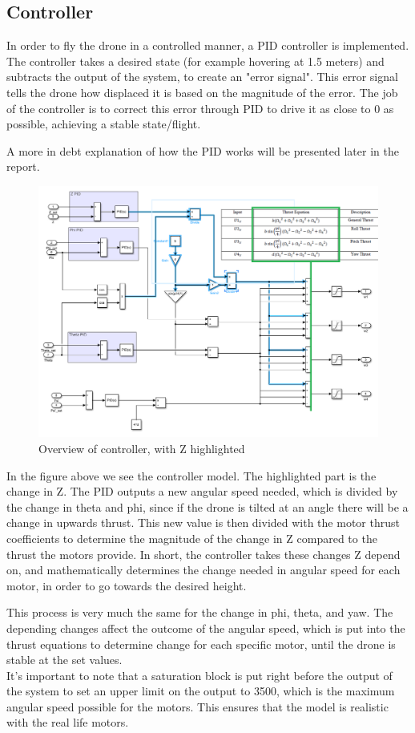 \subsection{Controller}\label{linear}
In order to fly the drone in a controlled manner, a PID controller is implemented.
The controller takes a desired state (for example hovering at 1.5 meters) and subtracts the output of the system, to create an "error signal".
This error signal tells the drone how displaced it is based on the magnitude of the error. The job of the controller is to correct this error through PID to drive it as close to 0 as possible, achieving a stable state/flight.

A more in debt explanation of how the PID works will be presented later in the report. 

\begin{figure}[H]
\begin{center}
   \includegraphics[scale =0.6]{pictures/control/Controller.png}
\end{center}
\caption{Overview of controller, with Z highlighted}
\end{figure}

In the figure above we see the controller model. The highlighted part is the change in Z. The PID outputs a new angular speed needed, which is divided by the change in theta and phi, since if the drone is tilted at an angle there will be a change in upwards thrust. This new value is then divided with the motor thrust coefficients to determine the magnitude of the change in Z compared to the thrust the motors provide. In short, the controller takes these changes Z depend on, and mathematically determines the change needed in angular speed for each motor, in order to go towards the desired height. \cite{Ferry}

This process is very much the same for the change in phi, theta, and yaw. The depending changes affect the outcome of the angular speed, which is put into the thrust equations to determine change for each specific motor, until the drone is stable at the set values.\\

It's important to note that a saturation block is put right before the output of the system to set an upper limit on the output to 3500, which is the maximum angular speed possible for the motors. This ensures that the model is realistic with the real life motors.